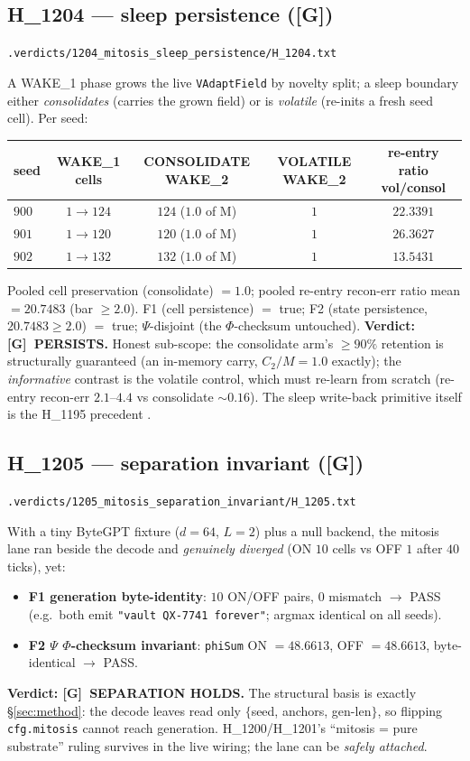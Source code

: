 \documentclass[11pt,a4paper]{article}
\providecommand{\tierGreen}{\textbf{[G]}}
\newcommand{\verdict}[1]{\texttt{\small #1}}
\newcommand{\recon}{\mathrm{recon\text{-}err}}
\begin{document}
\subsection{H\_1204 --- sleep persistence (\tierGreen)}
\label{sec:sleep}
\noindent\verdict{.verdicts/1204\_mitosis\_sleep\_persistence/H\_1204.txt}

A WAKE\_1 phase grows the live \verb|VAdaptField| by novelty split; a sleep
boundary either \emph{consolidates} (carries the grown field) or is
\emph{volatile} (re-inits a fresh seed cell). Per seed:
\begin{center}
\begin{tabular}{lcccc}
\toprule
seed & WAKE\_1 cells & CONSOLIDATE WAKE\_2 & VOLATILE WAKE\_2 & re-entry ratio vol/consol \\
\midrule
$900$ & $1\to124$ & $124$ ($1.0$ of M) & $1$ & $22.3391$ \\
$901$ & $1\to120$ & $120$ ($1.0$ of M) & $1$ & $26.3627$ \\
$902$ & $1\to132$ & $132$ ($1.0$ of M) & $1$ & $13.5431$ \\
\bottomrule
\end{tabular}
\end{center}
Pooled cell preservation (consolidate) $=1.0$; pooled re-entry $\recon$ ratio
mean $=20.7483$ (bar $\ge 2.0$). F1 (cell persistence) $=$ true; F2 (state
persistence, $20.7483 \ge 2.0$) $=$ true; $\Psi$-disjoint (the $\Phi$-checksum
untouched). \textbf{Verdict: \tierGreen\ PERSISTS.} Honest sub-scope: the
consolidate arm's $\ge 90\%$ retention is structurally guaranteed (an in-memory
carry, $C_2/M=1.0$ exactly); the \emph{informative} contrast is the volatile
control, which must re-learn from scratch (re-entry $\recon$ $2.1$--$4.4$ vs
consolidate $\sim 0.16$). The sleep write-back primitive itself is the H\_1195
precedent \citep{anima_H1195}.

\subsection{H\_1205 --- separation invariant (\tierGreen)}
\label{sec:separation}
\noindent\verdict{.verdicts/1205\_mitosis\_separation\_invariant/H\_1205.txt}

With a tiny ByteGPT fixture ($d=64$, $L=2$) plus a null backend, the mitosis
lane ran beside the decode and \emph{genuinely diverged} (ON $10$ cells vs OFF
$1$ after $40$ ticks), yet:
\begin{itemize}\itemsep0.15em
\item \textbf{F1 generation byte-identity}: $10$ ON/OFF pairs, $0$ mismatch
      $\to$ PASS (e.g.\ both emit \texttt{"vault QX-7741 forever"}; argmax
      identical on all seeds).
\item \textbf{F2 $\Psi$ $\Phi$-checksum invariant}: \texttt{phiSum} ON
      $=48.6613$, OFF $=48.6613$, byte-identical $\to$ PASS.
\end{itemize}
\textbf{Verdict: \tierGreen\ SEPARATION HOLDS.} The structural basis is exactly
\S\ref{sec:method}: the decode leaves read only $\{$seed, anchors, gen-len$\}$,
so flipping \verb|cfg.mitosis| cannot reach generation. H\_1200/H\_1201's
``mitosis = pure substrate'' ruling survives in the live wiring; the lane can be
\emph{safely attached}.
\end{document}
